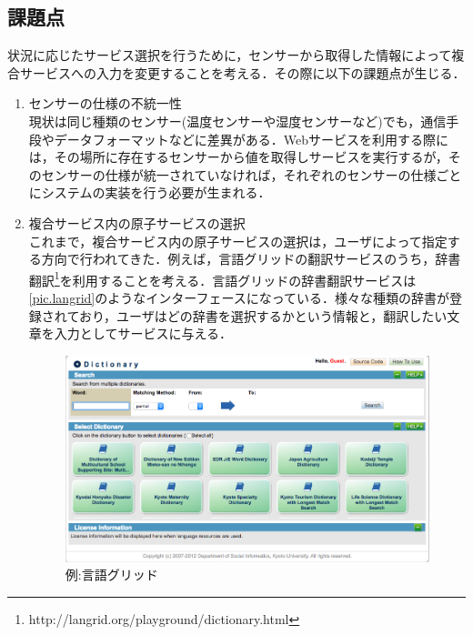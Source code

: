 \documentclass{kuisthesis}			%
\begin{document}
\subsection{課題点}
状況に応じたサービス選択を行うために，センサーから取得した情報によって複合サービスへの入力を変更することを考える．その際に以下の課題点が生じる．
\begin{enumerate}
\item センサーの仕様の不統一性\\
現状は同じ種類のセンサー(温度センサーや湿度センサーなど)でも，通信手段やデータフォーマットなどに差異がある．Webサービスを利用する際には，その場所に存在するセンサーから値を取得しサービスを実行するが，そのセンサーの仕様が統一されていなければ，それぞれのセンサーの仕様ごとにシステムの実装を行う必要が生まれる．
\item 複合サービス内の原子サービスの選択\\
これまで，複合サービス内の原子サービスの選択は，ユーザによって指定する方向で行われてきた．例えば，言語グリッドの翻訳サービスのうち，辞書翻訳\footnote{http://langrid.org/playground/dictionary.html}を利用することを考える．言語グリッドの辞書翻訳サービスは\ref{pic.langrid}のようなインターフェースになっている．様々な種類の辞書が登録されており，ユーザはどの辞書を選択するかという情報と，翻訳したい文章を入力としてサービスに与える．\\

\begin{figure}[H]
 \begin{center}
  \includegraphics[width=\linewidth]{pic/langrid.png}
  \caption{例:言語グリッド}
 \end{center}
 \label{pic:langrid}
\end{figure}



\end{enumerate}
\end{document}
